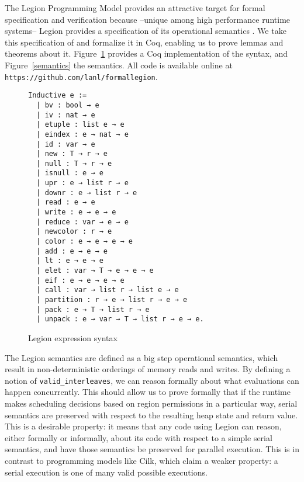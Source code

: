 \documentclass[sigconf]{acmart}
\begin{document}
The Legion Programming Model provides an attractive target for formal
specification and verification because  --unique among high performance runtime systems-- Legion
provides a specification of its operational semantics \cite{treichler2013language}.
We take this specification of and formalize it in Coq, enabling us to prove
lemmas and theorems about it. Figure~\ref{syntax} provides a Coq
implementation of the syntax, and Figure~\ref{semantics} the semantics. All
code is available online at \texttt{https://github.com/lanl/formallegion}. 

\begin{figure}
\centering
\begin{BVerbatim}
Inductive e :=
  | bv : bool → e
  | iv : nat → e
  | etuple : list e → e
  | eindex : e → nat → e
  | id : var → e
  | new : T → r → e
  | null : T → r → e
  | isnull : e → e
  | upr : e → list r → e
  | downr : e → list r → e
  | read : e → e 
  | write : e → e → e
  | reduce : var → e → e
  | newcolor : r → e
  | color : e → e → e → e
  | add : e → e → e
  | lt : e → e → e
  | elet : var → T → e → e → e
  | eif : e → e → e → e
  | call : var → list r → list e → e
  | partition : r → e → list r → e → e
  | pack : e → T → list r → e
  | unpack : e → var → T → list r → e → e.
\end{BVerbatim}
\caption{Legion expression syntax}
\label{syntax}
\end{figure}

The Legion semantics are defined as a big step operational semantics, which
result in non-deterministic orderings of memory reads and writes. By defining a
notion of \texttt{valid\_interleaves}, we can reason formally about what evaluations 
can happen concurrently. This should allow us to prove formally that if the
runtime makes scheduling decisions based on region permissions in a particular
way, serial semantics are preserved with respect to the resulting heap state
and return value. This is a desirable property: it means that any code using
Legion can reason, either formally or informally, about its code with respect
to a simple serial semantics, and have those semantics be preserved for
parallel execution. This is in contrast to programming models like Cilk, which
claim a weaker property: a serial execution is one of many valid possible executions. 
\end{document}
